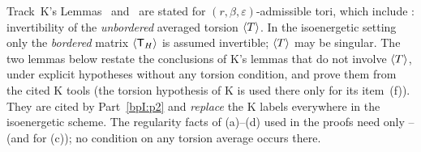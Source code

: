 Track~K's Lemmas~ and~ are stated for $(r,\beta,\varepsilon)$-admissible tori, which
include : invertibility of the \emph{unbordered} averaged torsion $\langle T\rangle$. In the isoenergetic setting only the
\emph{bordered} matrix $\langle \mathsf T_H\rangle$ is assumed invertible; $\langle T\rangle$ may be singular. The two lemmas below restate the
conclusions of K's lemmas that do not involve $\langle T\rangle$, under explicit hypotheses without any torsion condition, and prove them from
the cited K tools (the torsion hypothesis of K is used there only for its item~(f)). They are cited by Part~\ref{bpI:p2} and
\emph{replace} the K labels everywhere in the isoenergetic scheme. The regularity facts of (a)--(d) used in the
proofs need only -- (and  for (c)); no condition on any torsion average occurs there.

